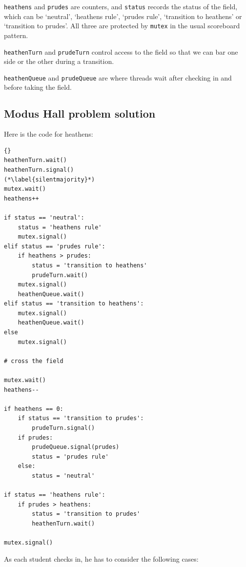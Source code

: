 \documentclass{book}
\newcommand{\clearemptydoublepage}{\newpage\cleardoublepage}
\begin{document}
{\tt heathens} and {\tt prudes} are counters, and {\tt status} records
the status of the field, which can be `neutral', `heathens rule',
`prudes rule', `transition to heathens' or `transition to prudes'.
All three are protected by {\tt mutex} in the usual scoreboard
pattern.

{\tt heathenTurn} and {\tt prudeTurn} control access to the field
so that we can bar one side or the other during a transition.

{\tt heathenQueue} and {\tt prudeQueue} are where threads wait after
checking in and before taking the field.


\clearemptydoublepage
\subsection {Modus Hall problem solution}

Here is the code for heathens:

\begin{latin}
\begin{lstlisting}[title={Modus problem solution}]{}
heathenTurn.wait()
heathenTurn.signal()
(*\label{silentmajority}*)
mutex.wait()
heathens++

if status == 'neutral':
    status = 'heathens rule'
    mutex.signal()
elif status == 'prudes rule':
    if heathens > prudes:
        status = 'transition to heathens'
        prudeTurn.wait()
    mutex.signal()
    heathenQueue.wait()
elif status == 'transition to heathens':
    mutex.signal()
    heathenQueue.wait()
else
    mutex.signal()

# cross the field

mutex.wait()
heathens--

if heathens == 0:
    if status == 'transition to prudes':
        prudeTurn.signal()
    if prudes:
        prudeQueue.signal(prudes)
        status = 'prudes rule'
    else:
        status = 'neutral'
        
if status == 'heathens rule':
    if prudes > heathens:
        status = 'transition to prudes'
        heathenTurn.wait()

mutex.signal()
\end{lstlisting}
\end{latin}

As each student checks in, he has to
consider the following cases:
\end{document}
